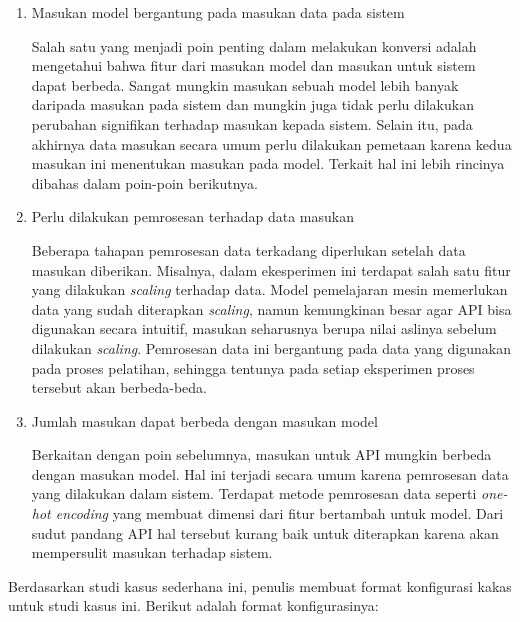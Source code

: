 \begin{enumerate}
	\item Masukan model bergantung pada masukan data pada sistem 
	
	Salah satu yang menjadi poin penting dalam melakukan konversi adalah mengetahui bahwa fitur dari masukan model dan masukan untuk sistem dapat berbeda.
	Sangat mungkin masukan sebuah model lebih banyak daripada masukan pada sistem dan mungkin juga tidak perlu dilakukan perubahan signifikan terhadap masukan kepada sistem.
	Selain itu, pada akhirnya data masukan secara umum perlu dilakukan pemetaan karena kedua masukan ini menentukan masukan pada model.
	Terkait hal ini lebih rincinya dibahas dalam poin-poin berikutnya.

	\item Perlu dilakukan pemrosesan terhadap data masukan
	
	Beberapa tahapan pemrosesan data terkadang diperlukan setelah data masukan diberikan.
	Misalnya, dalam ekesperimen ini terdapat salah satu fitur yang dilakukan \textit{scaling} terhadap data.
	Model pemelajaran mesin memerlukan data yang sudah diterapkan \textit{scaling}, namun kemungkinan besar agar API bisa digunakan secara intuitif, masukan seharusnya berupa nilai aslinya sebelum dilakukan \textit{scaling}.
	Pemrosesan data ini bergantung pada data yang digunakan pada proses pelatihan, sehingga tentunya pada setiap eksperimen proses tersebut akan berbeda-beda.
	
	\item Jumlah masukan dapat berbeda dengan masukan model
	
	Berkaitan dengan poin sebelumnya, masukan untuk API mungkin berbeda dengan masukan model.
	Hal ini terjadi secara umum karena pemrosesan data yang dilakukan dalam sistem.
	Terdapat metode pemrosesan data seperti \textit{one-hot encoding} yang membuat dimensi dari fitur bertambah untuk model.
	Dari sudut pandang API hal tersebut kurang baik untuk diterapkan karena akan mempersulit masukan terhadap sistem.
\end{enumerate}

Berdasarkan studi kasus sederhana ini, penulis membuat format konfigurasi kakas untuk studi kasus ini.
Berikut adalah format konfigurasinya:

